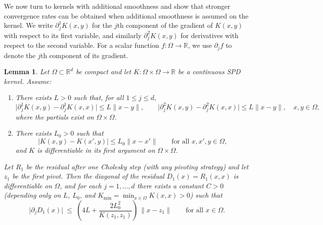 \documentclass{amsart}
\newtheorem{lemma}[theorem]{Lemma}
\theoremstyle{definition}
\theoremstyle{remark}
\begin{document}
We now turn to kernels with additional smoothness and show that stronger convergence rates can be obtained when additional smoothness is assumed on the kernel. We write $\partial_j^{1}K(x,y)$ for the $j$th component of the gradient of $K(x,y)$ with respect to its first variable, and similarly $\partial_j^{2}K(x,y)$ for derivatives with respect to the second variable. For a scalar function $f:\Omega\to\mathbb{R}$, we use $\partial_j f$ to denote the $j$th component of its gradient.

\begin{lemma}\label{lem:lipschitzchangemulti}
Let $\Omega\subset\mathbb{R}^d$ be compact and let $K:\Omega\times\Omega\to\mathbb{R}$ be a continuous SPD kernel.
Assume:
\begin{enumerate}[label=(\alph*)]
\item There exists $L>0$ such that, for all $1\le j\le d$,
\begin{equation}\label{eq:diag-deriv-lip}
\bigl|\partial_j^{1}K(x,y)-\partial_j^{1}K(x,x)\bigr|\le L\|x-y\|,
\qquad
\bigl|\partial_j^{2}K(x,y)-\partial_j^{2}K(x,x)\bigr|\le L\|x-y\|,
\quad x,y\in\Omega,
\end{equation}
where the partials exist on $\Omega\times\Omega$.
\item There exists $L_0>0$ such that
\begin{equation}\label{eq:first-arg-lip}
\bigl|K(x,y)-K(x',y)\bigr|\le L_0\|x-x'\|\qquad \text{for all }x,x',y\in\Omega,
\end{equation}
and $K$ is differentiable in its first argument on $\Omega\times\Omega$.
\end{enumerate}
Let $R_1$ be the residual after one Cholesky step (with any pivoting strategy) and let $z_1$ be the first pivot. Then the diagonal of the residual $D_1(x)=R_1(x,x)$ is differentiable on $\Omega$, and for each $j=1,\dots,d$ there exists a constant $C>0$ (depending only on $L$, $L_0$, and $K_{\min}=\min_{x\in\Omega}K(x,x)>0$) such that
\begin{equation}\label{eq:grad-D1-linear}
\bigl|\partial_j D_1(x)\bigr|\;\le\; \left(4L + \frac{2L_0^2}{K(z_1,z_1)}\right)\,\|x-z_1\|\qquad \text{for all }x\in\Omega.
\end{equation}
\end{lemma}
\end{document}
